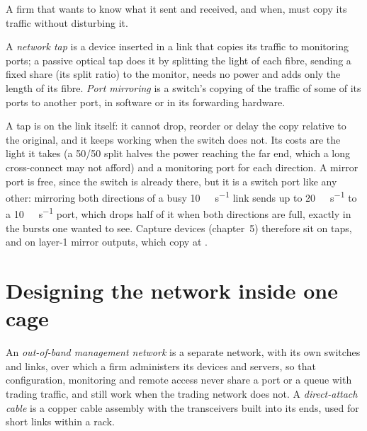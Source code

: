 A firm that wants to know what it sent and received, and when, must copy its traffic without disturbing it.

\begin{definition}\label{def:nw:switches-and-layer-1-devices:tap}
A \emph{network tap} is a device inserted in a link that copies its traffic to monitoring ports; a passive
optical tap does it by splitting the light of each fibre, sending a fixed share (its split ratio) to the monitor, needs no power
and adds only the length of its fibre. \emph{Port mirroring} is a switch's copying of the traffic of some of
its ports to another port, in software or in its forwarding hardware.
\end{definition}

A tap is on the link itself: it cannot drop, reorder or delay the copy relative to the original, and it keeps working when the
switch does not. Its costs are the light it takes (a 50/50 split halves the power reaching the far end, which a long cross-connect
may not afford) and a monitoring port for each direction. A mirror port is free, since the switch is already there, but it is a
switch port like any other: mirroring both directions of a busy \qty{10}{\giga\bit\per\second} link sends up to
\qty{20}{\giga\bit\per\second} to a \qty{10}{\giga\bit\per\second} port, which drops half of it when both directions are full, exactly in
the bursts one wanted to see. Capture devices (chapter~5) therefore sit on taps, and on layer-1 mirror outputs, which copy at .

\section{Designing the network inside one cage}

\begin{definition}\label{def:nw:switches-and-layer-1-devices:oob}
An \emph{out-of-band management network} is a separate network, with its own switches and
links, over which a firm administers its devices and servers, so that configuration, monitoring and remote access never share
a port or a queue with trading traffic, and still work when the trading network does not. A \emph{direct-attach
cable} is a copper cable assembly with the transceivers built into its ends, used for short links
within a rack.
\end{definition}

